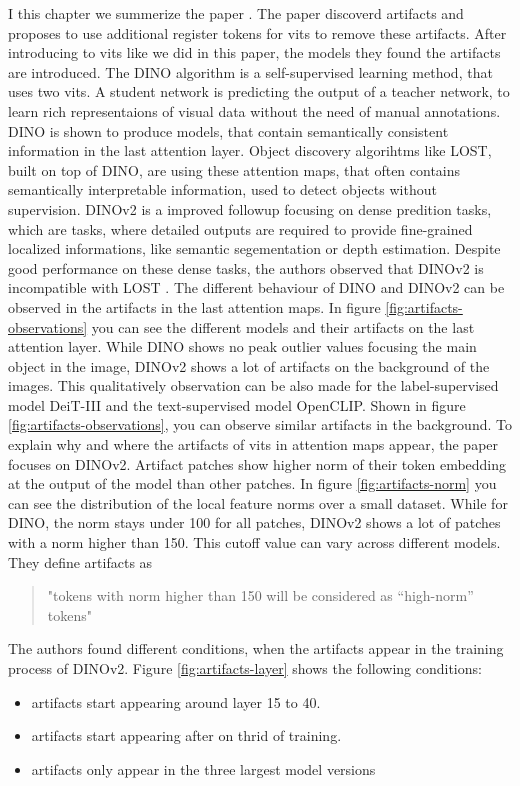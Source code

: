 \documentclass[conference]{IEEEtran}
\begin{document}
I this chapter we summerize the paper \cite{registers}. The paper discoverd artifacts and proposes to use additional register tokens for \acp{vit} to remove these artifacts.
After introducing to \acp{vit} like we did in this paper, the models they found the artifacts are introduced. The DINO algorithm is a self-supervised learning method, that uses two \acp{vit}. A student network is predicting the output of a teacher network, to learn rich representaions of visual data without the need of manual annotations. \cite{dino} DINO is shown to produce models, that contain semantically consistent information in the last attention layer. Object discovery algorihtms like LOST, built on top of DINO, are using these attention maps, that often contains semantically interpretable information, used to detect objects without supervision. DINOv2 \cite{dinov2} is a improved followup focusing on dense predition tasks, which are tasks, where detailed outputs are required to provide fine-grained localized informations, like semantic segementation or depth estimation. Despite good performance on these dense tasks, the authors observed that DINOv2 is incompatible with LOST \cite{registers}. The different behaviour of DINO and DINOv2 can be observed in the artifacts in the last attention maps. In figure \ref{fig:artifacts-observations} you can see the different models and their artifacts on the last attention layer.
While DINO shows no peak outlier values focusing the main object in the image, DINOv2 shows a lot of artifacts on the background of the images. This qualitatively observation can be also made for the label-supervised model DeiT-III and the text-supervised model OpenCLIP. Shown in figure \ref{fig:artifacts-observations}, you can observe similar artifacts in the background.
To explain why and where the artifacts of \acp{vit} in attention maps appear, the paper focuses on DINOv2. 
Artifact patches show higher norm of their token embedding at the output of the model than other patches. In figure \ref{fig:artifacts-norm} you can see the distribution of the local feature norms over a small dataset. While for DINO, the norm stays under 100 for all patches, DINOv2 shows a lot of patches with a norm higher than 150. This cutoff value can vary across different models. They define artifacts as
\begin{quote}
    "tokens with norm higher than 150 will be considered as “high-norm” tokens" \cite{registers}
\end{quote}

The authors found different conditions, when the artifacts appear in the training process of DINOv2. Figure \ref{fig:artifacts-layer} shows the following conditions:
\begin{itemize}
    \item artifacts start appearing around layer 15 to 40.
    \item artifacts start appearing after on thrid of training.
    \item artifacts only appear in the three largest model versions
\end{itemize}
\end{document}
